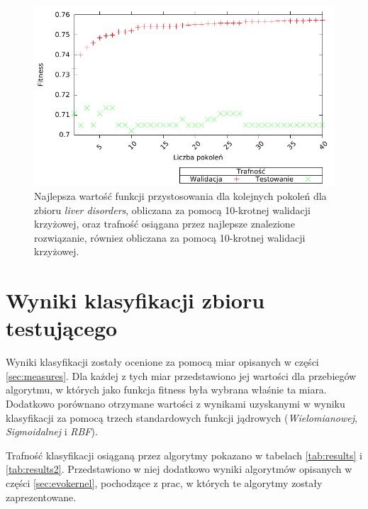    \begin{figure}
        \includegraphics[scale=0.90]{figures/results/fitness/fitness-liver-disorders-CV}
         \caption{Najlepsza wartość funkcji przystosowania dla kolejnych pokoleń dla zbioru \emph{liver disorders}, obliczana za pomocą 10-krotnej walidacji krzyżowej, oraz trafność osiągana przez najlepsze znalezione rozwiązanie, równiez obliczana za pomocą 10-krotnej walidacji krzyżowej.				\label{fig:fit-liver-disorders-cv}}
   \end{figure}    
	
\FloatBarrier
\section{Wyniki klasyfikacji zbioru testującego}
	Wyniki klasyfikacji zostały ocenione za pomocą miar opisanych w części \ref{sec:measures}. Dla każdej z tych miar przedstawiono jej wartości dla przebiegów algorytmu, w których jako funkcja fitness była wybrana właśnie ta miara. Dodatkowo porównano otrzymane wartości z wynikami uzyskanymi w wyniku klasyfikacji za pomocą trzech standardowych funkcji jądrowych (\emph{Wielomianowej}, \emph{Sigmoidalnej} i \emph{RBF}).
	
	Trafność klasyfikacji osiąganą przez algorytmy pokazano w tabelach \ref{tab:results} i \ref{tab:results2}. Przedstawiono w niej dodatkowo wyniki algorytmów opisanych w części \ref{sec:evokernel}, pochodzące z prac, w których te algorytmy zostały zaprezentowane.
	

